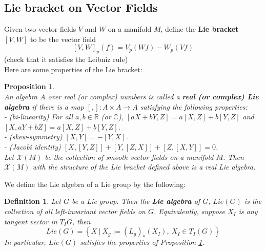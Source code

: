 \documentclass[11pt]{article}
\newtheorem{proposition}[theorem]{Proposition}
\newtheorem{definition}[theorem]{Definition}
\newcommand{\bb}[1]{\mathbb{#1}}
\newcommand{\mc}[1]{\mathcal{#1}}
\begin{document}
\subsection{Lie bracket on Vector Fields}
Given two vector fields $V$ and $W$ on a manifold $M$, define the \textbf{Lie bracket} $[V,W]$ to be the vector field
$$[V,W]_p(f) = V_p (Wf) - W_p(Vf)$$
(check that it satisfies the Leibniz rule)\\
Here are some properties of the Lie bracket:
\begin{proposition}\label{liebracket} \mbox{}\\
An algebra $A$ over real (or complex) numbers is called a \textbf{real (or complex) Lie algebra} if there is a map $[,]: A \times A \to A$ satisfying the following properties:\\
- (bi-linearity) For all $a, b \in \bb{R}$ (or $\bb{C}$), $[aX+bY, Z] = a[X,Z] + b[Y,Z]$ and $[X,aY+bZ] = a[X,Z]+b[Y,Z]$.\\
- (skew-symmetry) $[X,Y] = -[Y,X]$.\\
- (Jacobi identity) $[X,[Y,Z]]+[Y,[Z,X]]+[Z,[X,Y]] = 0$.\\

\noindent Let $\mc{X}(M)$ be the collection of smooth vector fields on a manifold $M$. Then $\mc{X}(M)$ with the structure of the Lie bracket defined above is a real Lie algebra.
\end{proposition}
We define the Lie algebra of a Lie group by the following:
\begin{definition}
Let $G$ be a Lie group. Then the \textbf{Lie algebra} of $G$, $Lie(G)$ is the collection of all left-invariant vector fields on $G$. Equivalently, suppose $X_I$ is any tangent vector in $T_IG$, then
$$Lie(G) = \left\{ X\ \Big|\ X_g:=(L_g)_*(X_I),\ X_I \in T_I(G) \right\}$$
In particular, $Lie(G)$ satisfies the properties of Proposition \ref{liebracket}.
\end{definition}
\end{document}
